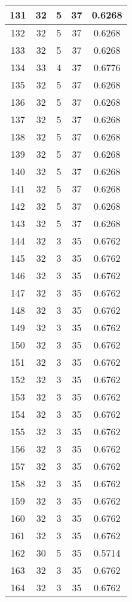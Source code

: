 \documentclass[letterpaper, 12pt]{article}
\begin{document}
\begin{longtable}{|c|c|c|c|c|}
131 & 32 & 5 & 37 & 0.6268 \\
\hline
132 & 32 & 5 & 37 & 0.6268 \\
\hline
133 & 32 & 5 & 37 & 0.6268 \\
\hline
134 & 33 & 4 & 37 & 0.6776 \\
\hline
135 & 32 & 5 & 37 & 0.6268 \\
\hline
136 & 32 & 5 & 37 & 0.6268 \\
\hline
137 & 32 & 5 & 37 & 0.6268 \\
\hline
138 & 32 & 5 & 37 & 0.6268 \\
\hline
139 & 32 & 5 & 37 & 0.6268 \\
\hline
140 & 32 & 5 & 37 & 0.6268 \\
\hline
141 & 32 & 5 & 37 & 0.6268 \\
\hline
142 & 32 & 5 & 37 & 0.6268 \\
\hline
143 & 32 & 5 & 37 & 0.6268 \\
\hline
144 & 32 & 3 & 35 & 0.6762 \\
\hline
145 & 32 & 3 & 35 & 0.6762 \\
\hline
146 & 32 & 3 & 35 & 0.6762 \\
\hline
147 & 32 & 3 & 35 & 0.6762 \\
\hline
148 & 32 & 3 & 35 & 0.6762 \\
\hline
149 & 32 & 3 & 35 & 0.6762 \\
\hline
150 & 32 & 3 & 35 & 0.6762 \\
\hline
151 & 32 & 3 & 35 & 0.6762 \\
\hline
152 & 32 & 3 & 35 & 0.6762 \\
\hline
153 & 32 & 3 & 35 & 0.6762 \\
\hline
154 & 32 & 3 & 35 & 0.6762 \\
\hline
155 & 32 & 3 & 35 & 0.6762 \\
\hline
156 & 32 & 3 & 35 & 0.6762 \\
\hline
157 & 32 & 3 & 35 & 0.6762 \\
\hline
158 & 32 & 3 & 35 & 0.6762 \\
\hline
159 & 32 & 3 & 35 & 0.6762 \\
\hline
160 & 32 & 3 & 35 & 0.6762 \\
\hline
161 & 32 & 3 & 35 & 0.6762 \\
\hline
162 & 30 & 5 & 35 & 0.5714 \\
\hline
163 & 32 & 3 & 35 & 0.6762 \\
\hline
164 & 32 & 3 & 35 & 0.6762 \\

\end{longtable}
\end{document}
